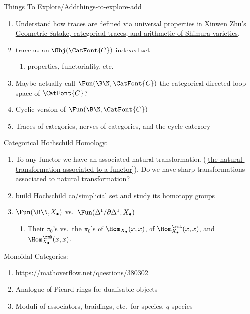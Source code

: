 \begin{remark}{Things To Explore/Add}{things-to-explore-add}
\begin{enumerate}
\begin{enumerate}
                    Is there a way to do the same for the trace of sets, or otherwise work with traces of large categories?
            \end{enumerate}
        \item Understand how traces are defined via universal properties in Xinwen Zhu's \href{https://arxiv.org/abs/1810.07375}{Geometric Satake, categorical traces, and arithmetic of Shimura varieties}.
        \item trace as an $\Obj(\CatFont{C})$-indexed set
            \begin{enumerate}
                \item properties, functoriality, etc.
            \end{enumerate}
        \item Maybe actually call $\Fun(\B\N,\CatFont{C})$ the categorical directed loop space of $\CatFont{C}$?
        \item Cyclic version of $\Fun(\B\N,\CatFont{C})$
        \item Traces of categories, nerves of categories, and the cycle category
    \end{enumerate}
    Categorical Hochschild Homology:
    \begin{enumerate}
        \item To any functor we have an associated natural transformation (\cref{the-natural-transformation-associated-to-a-functor}). Do we have sharp transformations associated to natural transformation?
        \item build Hochschild co/simplicial set and study its homotopy groups
        \item $\Fun(\B\N,X_{\bullet})$ vs.\ $\Fun(\Delta^{1}/\partial\Delta^{1},X_{\bullet})$
            \begin{enumerate}
                \item Their $\pi_{0}$'s vs.\ the $\pi_{0}$'s of $\Hom_{X_{\bullet}}(x,x)$, of $\Hom^{\rmL}_{X_{\bullet}}(x,x)$, and $\Hom^{\rmR}_{X_{\bullet}}(x,x)$.
            \end{enumerate}
    \end{enumerate}
    Monoidal Categories:
    \begin{enumerate}
        \item \url{https://mathoverflow.net/questions/380302}
        \item Analogue of Picard rings for dualisable objects
        \item Moduli of associators, braidings, etc.\ for species, $q$-species

\end{enumerate}
\end{remark}

